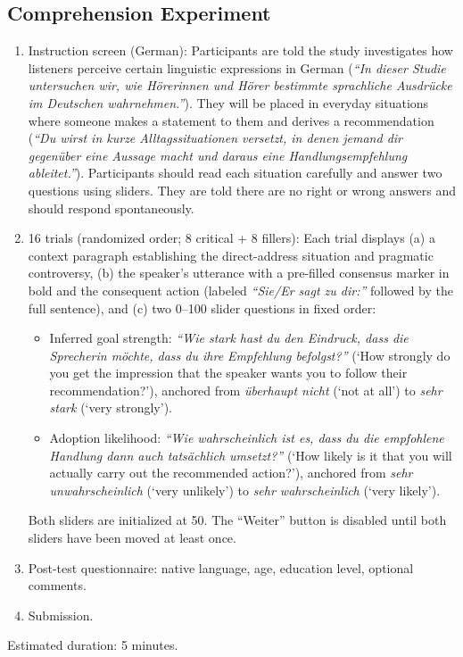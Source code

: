 \documentclass[12pt]{article}
\begin{document}
\subsection{Comprehension Experiment}
\begin{enumerate}
    \item Instruction screen (German): Participants are told the study investigates how listeners perceive certain linguistic expressions in German (\textit{``In dieser Studie untersuchen wir, wie H\"orerinnen und H\"orer bestimmte sprachliche Ausdr\"ucke im Deutschen wahrnehmen.''}). They will be placed in everyday situations where someone makes a statement to them and derives a recommendation (\textit{``Du wirst in kurze Alltagssituationen versetzt, in denen jemand dir gegen\"uber eine Aussage macht und daraus eine Handlungsempfehlung ableitet.''}). Participants should read each situation carefully and answer two questions using sliders. They are told there are no right or wrong answers and should respond spontaneously.
    \item 16 trials (randomized order; 8 critical + 8 fillers): Each trial displays (a) a context paragraph establishing the direct-address situation and pragmatic controversy, (b) the speaker's utterance with a pre-filled consensus marker in bold and the consequent action (labeled \textit{``Sie/Er sagt zu dir:''} followed by the full sentence), and (c) two 0--100 slider questions in fixed order:
    \begin{itemize}
        \item Inferred goal strength: \textit{``Wie stark hast du den Eindruck, dass die Sprecherin m\"ochte, dass du ihre Empfehlung befolgst?''} (`How strongly do you get the impression that the speaker wants you to follow their recommendation?'), anchored from \textit{\"uberhaupt nicht} (`not at all') to \textit{sehr stark} (`very strongly').
        \item Adoption likelihood: \textit{``Wie wahrscheinlich ist es, dass du die empfohlene Handlung dann auch tats\"achlich umsetzt?''} (`How likely is it that you will actually carry out the recommended action?'), anchored from \textit{sehr unwahrscheinlich} (`very unlikely') to \textit{sehr wahrscheinlich} (`very likely').
    \end{itemize}
    Both sliders are initialized at 50. The ``Weiter'' button is disabled until both sliders have been moved at least once.
    \item Post-test questionnaire: native language, age, education level, optional comments.
    \item Submission.
\end{enumerate}
Estimated duration: 5 minutes.
\end{document}
